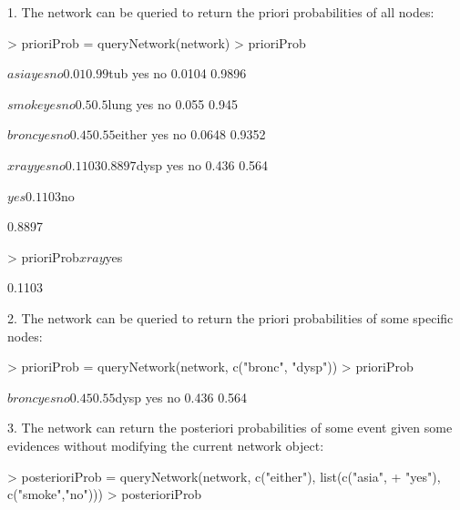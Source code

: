 \documentclass[a4paper]{article}
\begin{document}
1. The network can be queried to return the priori probabilities of all nodes:

\begin{Schunk}
\begin{Sinput}
> prioriProb = queryNetwork(network)
> prioriProb
\end{Sinput}
\begin{Soutput}
$asia
		yes		no
		0.01		0.99

$tub
		yes		no
		0.0104		0.9896

$smoke
		yes		no
		0.5		0.5

$lung
		yes		no
		0.055		0.945

$bronc
		yes		no
		0.45		0.55

$either
		yes		no
		0.0648		0.9352

$xray
		yes		no
		0.1103		0.8897

$dysp
		yes		no
		0.436		0.564
\end{Soutput}
\begin{Soutput}
$yes

		0.1103

$no

		0.8897
\end{Soutput}
\begin{Sinput}
> prioriProb$xray$yes
\end{Sinput}
\begin{Soutput}
[1] 0.1103
\end{Soutput}
\end{Schunk}


2. The network can be queried to return the priori probabilities of some specific nodes:

\begin{Schunk}
\begin{Sinput}
> prioriProb = queryNetwork(network, c("bronc", "dysp"))
> prioriProb
\end{Sinput}
\begin{Soutput}
$bronc
		yes		no
		0.45		0.55

$dysp
		yes		no
		0.436		0.564
\end{Soutput}
\end{Schunk}

3. The network can return the posteriori probabilities of some event given some evidences without modifying the current network object:

\begin{Schunk}
\begin{Sinput}
> posterioriProb = queryNetwork(network, c("either"), list(c("asia",
+ "yes"), c("smoke","no")))
> posterioriProb
\end{Sinput}
\end{Schunk}
\end{document}
